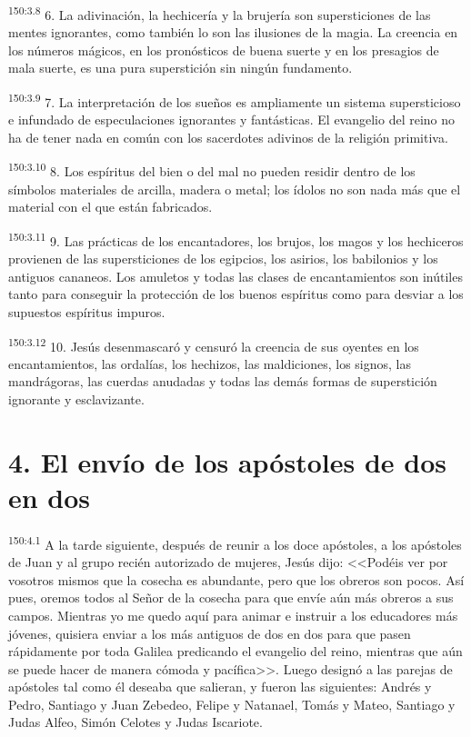\par 
\textsuperscript{150:3.8} 6. La adivinación, la hechicería y la brujería son supersticiones de las mentes ignorantes, como también lo son las ilusiones de la magia. La creencia en los números mágicos, en los pronósticos de buena suerte y en los presagios de mala suerte, es una pura superstición sin ningún fundamento.

\par 
\textsuperscript{150:3.9} 7. La interpretación de los sueños es ampliamente un sistema supersticioso e infundado de especulaciones ignorantes y fantásticas. El evangelio del reino no ha de tener nada en común con los sacerdotes adivinos de la religión primitiva.

\par 
\textsuperscript{150:3.10} 8. Los espíritus del bien o del mal no pueden residir dentro de los símbolos materiales de arcilla, madera o metal; los ídolos no son nada más que el material con el que están fabricados.

\par 
\textsuperscript{150:3.11} 9. Las prácticas de los encantadores, los brujos, los magos y los hechiceros provienen de las supersticiones de los egipcios, los asirios, los babilonios y los antiguos cananeos. Los amuletos y todas las clases de encantamientos son inútiles tanto para conseguir la protección de los buenos espíritus como para desviar a los supuestos espíritus impuros.

\par 
\textsuperscript{150:3.12} 10. Jesús desenmascaró y censuró la creencia de sus oyentes en los encantamientos, las ordalías, los hechizos, las maldiciones, los signos, las mandrágoras, las cuerdas anudadas y todas las demás formas de superstición ignorante y esclavizante.

\section*{4. El envío de los apóstoles de dos en dos}
\par 
\textsuperscript{150:4.1} A la tarde siguiente, después de reunir a los doce apóstoles, a los apóstoles de Juan y al grupo recién autorizado de mujeres, Jesús dijo: <<Podéis ver por vosotros mismos que la cosecha es abundante, pero que los obreros son pocos. Así pues, oremos todos al Señor de la cosecha para que envíe aún más obreros a sus campos. Mientras yo me quedo aquí para animar e instruir a los educadores más jóvenes, quisiera enviar a los más antiguos de dos en dos para que pasen rápidamente por toda Galilea predicando el evangelio del reino, mientras que aún se puede hacer de manera cómoda y pacífica>>. Luego designó a las parejas de apóstoles tal como él deseaba que salieran, y fueron las siguientes: Andrés y Pedro, Santiago y Juan Zebedeo, Felipe y Natanael, Tomás y Mateo, Santiago y Judas Alfeo, Simón Celotes y Judas Iscariote.

